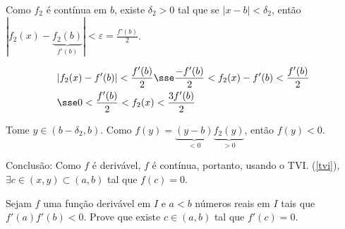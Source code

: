 \documentclass{book}
\begin{document}
\begin{sol}
\begin{sloppypar}
Como $f_2$ \'e cont\'inua em $b$, existe $\delta_2 > 0$ tal que se $|x - b| < \delta_2$, ent\~ao ${\left| {f_2 (x) - \underbrace {f_2 (b)}_{f'(b)}} \right| < \varepsilon  = \frac{{f'(b)}}{2}}$.
\end{sloppypar}

\[
\begin{gathered}
  |f_2(x) - f'(b)| < \frac{f'(b)}{2} \sse \frac{-f'(b)}{2} < f_2(x) - f'(b) < \frac{f'(b)}{2} \hfill \\
  \sse 0 < \frac{f'(b)}{2} < f_2(x) < \frac{3f'(b)}{2} \hfill \\ 
\end{gathered} 
\]

Tome $y \in (b - \delta_2,b)$. Como $f(y) = \underbrace{(y - b)}_{<0} \underbrace{f_2(y)}_{>0}$, ent\~ao $f(y) < 0$.

Conclus\~ao: Como $f$ \'e deriv\'avel, $f$ \'e cont\'inua, portanto, usando o TVI. (\ref{tvi}), $\exists c \in (x,y) \subset (a,b)$ tal que $f(c) = 0$.
\end{sol}

\begin{exerc}
Sejam $f$ uma fun\c c\~ao deriv\'avel em $I$ e $a < b$ n\'umeros reais em $I$ tais que $f'(a)f'(b) < 0$. Prove que existe $c \in (a,b)$ tal que $f'(c) = 0$.
\end{exerc}
\end{document}
